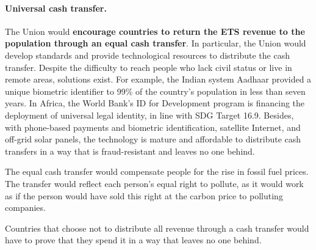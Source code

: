 \documentclass[12pt,english]{article}
\begin{document}
\paragraph{Universal cash transfer.} 
The Union would \textbf{encourage countries to return the ETS revenue to the population through an equal cash transfer}. In particular, the Union would develop standards and provide technological resources to distribute the cash transfer. Despite the difficulty to reach people who lack civil status or live in remote areas, solutions exist. For example, the Indian system Aadhaar provided a unique biometric identifier to 99\% of the country's population in less than seven years. In Africa, the World Bank's ID for Development program is financing the deployment of universal legal identity, in line with SDG Target 16.9. Besides, with phone-based payments and biometric identification, satellite Internet, and off-grid solar panels, the technology is mature and affordable to distribute cash transfers in a way that is fraud-resistant and leaves no one behind.

The equal cash transfer would compensate people for the rise in fossil fuel prices. The transfer would reflect each person's equal right to pollute, as it would work as if the person would have sold this right at the carbon price to polluting companies.

Countries that choose not to distribute all revenue through a cash transfer would have to prove that they spend it %
in a way that leaves no one behind. %

\end{document}
